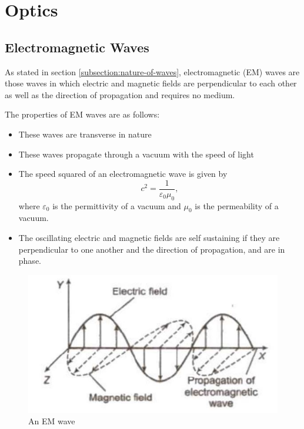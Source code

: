 \section{Optics}

\subsection{Electromagnetic Waves}
\label{subsection:electromagnetic-waves}

As stated in section \ref{subsection:nature-of-waves}, electromagnetic (EM) waves are those waves in which electric and magnetic fields are perpendicular to each other as well as the direction of propagation and requires no medium. 

\noindent The properties of EM waves are as follows:
\begin{itemize}
    \item These waves are transverse in nature
    \item These waves propagate through a vacuum with the speed of light
    \item The speed squared of an electromagnetic wave is given by 
    \begin{equation}
        c^2 = \frac{1}{\varepsilon_0 \mu_0},
    \end{equation}
    where $\varepsilon_0$ is the permittivity of a vacuum and $\mu_0$ is the permeability of a vacuum.
    \item The oscillating electric and magnetic fields are self sustaining if they are perpendicular to one another and the direction of propagation, and are in phase.
\end{itemize}

\begin{figure}[h!]
    \centering
    \includegraphics{notes/images/EM.JPG}
    \caption{An EM wave}
\end{figure}
\FloatBarrier

